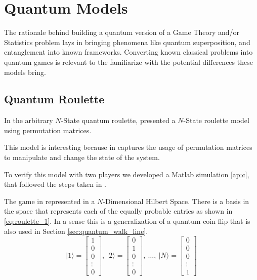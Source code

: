\clearpage
\section{Quantum Models}
\label{sec:quantum_models}

The rationale behind building a quantum version of a Game Theory and/or Statistics problem lays in bringing phenomena like quantum superposition, and entanglement into known frameworks. Converting known classical problems into quantum games is relevant to the familiarize with the potential differences these models bring.

\subsection{Quantum Roulette}
\label{subsec:quantum_roulette}

In the arbitrary $N$-State quantum roulette,\cite{Salimi2009} presented a $N$-State roulette model using permutation matrices. 

This model is interesting because in captures the usage of permutation matrices to manipulate and change the state of the system.

To verify this model with two players we developed a Matlab simulation \ref{ap:c}, that followed the steps taken in \cite{Salimi2009}.

The game in represented in a $N$-Dimensional Hilbert Space. There is a basis in the space that represents each of the equally probable entries as shown in \ref{eq:roulette_1}. In a sense this is a generalization of a quantum coin flip that is also used in Section \ref{sec:quantum_walk_line}.
\begin{equation}
\label{eq:roulette_1}
\vert1\rangle=\left[\begin{array}{c}
1\\
0\\
0\\
\vdots\\
0
\end{array}\right],\:\vert2\rangle=\left[\begin{array}{c}
0\\
1\\
0\\
\vdots\\
0
\end{array}\right],\:\ldots,\:\vert N\rangle=\left[\begin{array}{c}
0\\
0\\
0\\
\vdots\\
1
\end{array}\right]
\end{equation}

